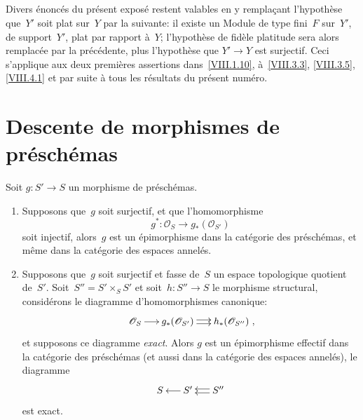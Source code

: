 \subsection{}
\label{VIII.4.10}
Divers
\'enonc\'es du pr\'esent expos\'e restent valables en y
rempla\c cant l'hypoth\`ese que~$Y'$ soit plat sur~$Y$ par la
suivante: il existe un Module de type fini~$F$ sur~$Y'$, de
support~$Y'$, plat par rapport \`a~$Y$; l'hypoth\`ese de
fid\`ele platitude sera alors remplac\'ee par la
pr\'ec\'edente, plus l'hypoth\`ese que $Y'\to Y$ est
surjectif. Ceci s'applique aux deux premi\`eres assertions
dans~\ref{VIII.1.10}, \`a~\ref{VIII.3.3}, \ref{VIII.3.5},
\ref{VIII.4.1} et par suite \`a tous les r\'esultats du
pr\'esent num\'ero.

\section{Descente de morphismes de pr\'esch\'emas}
\label{VIII.5}

\begin{proposition}
\label{VIII.5.1}
Soit $g\colon S'\to S$ un morphisme de pr\'esch\'emas.
\begin{enumerate}
\item[a)] Supposons que~$g$ soit surjectif, et que l'homomorphisme
$$
g^*\colon \mathcal{O}_{S}\to g_*(\mathcal{O}_{S'})
$$
soit injectif, alors~$g$ est un \'epimorphisme dans la cat\'egorie
des pr\'esch\'emas, et m\^eme dans la cat\'egorie des espaces
annel\'es.
\item[b)] Supposons que~$g$ soit surjectif et fasse de~$S$ un espace
topologique quotient de~$S'$. Soit~$S''=S'\times_{S}S'$ et
soit~$h\colon S''\to S$ le morphisme structural, consid\'erons le
diagramme d'homomorphismes canonique:
$$
\xymatrix@C=.5cm{{\mathcal{O}_{S}}\ar[r]&{g_*(\mathcal{O}_{S'})}\ar@<2pt>[r]\ar@<-2pt>[r]&{h_*(\mathcal{O}_{S''})}}\quoi,
$$
et supposons ce diagramme \emph{exact}. Alors $g$ est un
\'epimorphisme effectif
dans la cat\'egorie des pr\'esch\'emas (et aussi dans la
cat\'egorie des espaces annel\'es), \ie le diagramme
$$
\xymatrix@C=.5cm{{S}&{S'}\ar[l]&{S''}\ar@<2pt>[l]\ar@<-2pt>[l]}
$$
est exact.
\end{enumerate}
\end{proposition}

